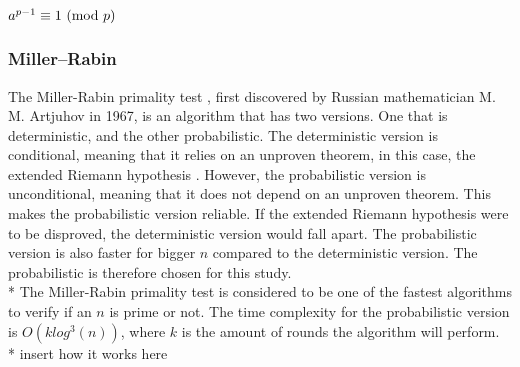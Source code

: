\documentclass[main.tex]{subfiles}
\begin{document}
\begin{mdframed}
  \centering $a^{p - 1} \equiv 1 \ (\mathrm{mod}\ p)$
\end{mdframed}

\subsubsection{Miller–Rabin}
The Miller-Rabin primality test \cite{algh:miller}, first discovered by Russian
mathematician M. M. Artjuhov in 1967, is an algorithm that has two versions. One
that is deterministic, and the other probabilistic. The deterministic version is
conditional, meaning that it relies on an unproven theorem, in this case, the
extended Riemann hypothesis \cite{riemann}. However, the probabilistic version
is unconditional, meaning that it does not depend on an unproven theorem. This
makes the probabilistic version reliable. If the extended Riemann hypothesis
were to be disproved, the deterministic version would fall apart. The
probabilistic version is also faster for bigger $n$ compared to the
deterministic version. The probabilistic is therefore chosen for this study.
\newline
\\*
The Miller-Rabin primality test is considered to be one of the fastest
algorithms to verify if an $n$ is prime or not. The time complexity for the
probabilistic version is $O(k log^{3}(n))$, where $k$ is the amount of rounds
the algorithm will perform. \newline
\\*
insert how it works here
\end{document}
